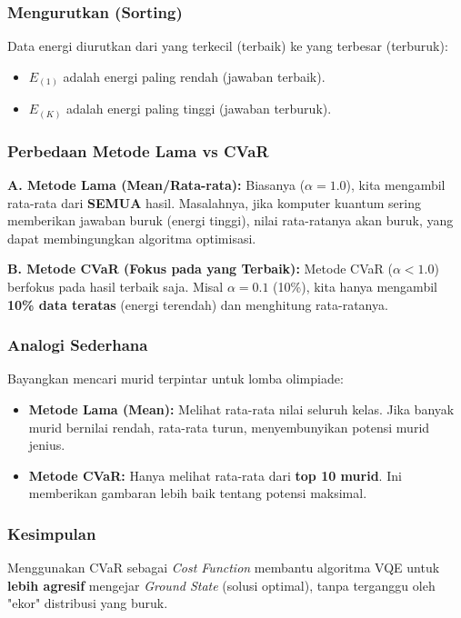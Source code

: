 \subsubsection{Mengurutkan (Sorting)}
Data energi diurutkan dari yang terkecil (terbaik) ke yang terbesar (terburuk):
\begin{itemize}
    \item $E_{(1)}$ adalah energi paling rendah (jawaban terbaik).
    \item $E_{(K)}$ adalah energi paling tinggi (jawaban terburuk).
\end{itemize}

\subsubsection{Perbedaan Metode Lama vs CVaR}
\textbf{A. Metode Lama (Mean/Rata-rata):}
Biasanya ($\alpha = 1.0$), kita mengambil rata-rata dari \textbf{SEMUA} hasil. Masalahnya, jika komputer kuantum sering memberikan jawaban buruk (energi tinggi), nilai rata-ratanya akan buruk, yang dapat membingungkan algoritma optimisasi.

\textbf{B. Metode CVaR (Fokus pada yang Terbaik):}
Metode CVaR ($\alpha < 1.0$) berfokus pada hasil terbaik saja. Misal $\alpha = 0.1$ (10\%), kita hanya mengambil \textbf{10\% data teratas} (energi terendah) dan menghitung rata-ratanya.

\subsubsection{Analogi Sederhana}
Bayangkan mencari murid terpintar untuk lomba olimpiade:
\begin{itemize}
    \item \textbf{Metode Lama (Mean):} Melihat rata-rata nilai seluruh kelas. Jika banyak murid bernilai rendah, rata-rata turun, menyembunyikan potensi murid jenius.
    \item \textbf{Metode CVaR:} Hanya melihat rata-rata dari \textbf{top 10 murid}. Ini memberikan gambaran lebih baik tentang potensi maksimal.
\end{itemize}

\subsubsection{Kesimpulan}
Menggunakan CVaR sebagai \textit{Cost Function} membantu algoritma VQE untuk \textbf{lebih agresif} mengejar \textit{Ground State} (solusi optimal), tanpa terganggu oleh "ekor" distribusi yang buruk.
